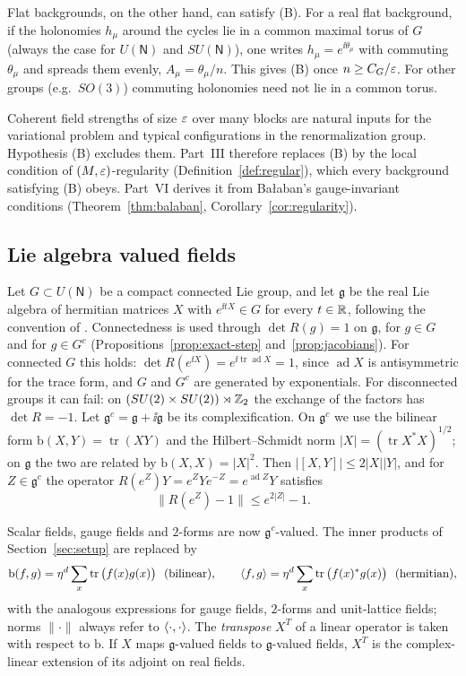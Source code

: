 Flat backgrounds, on the other hand, can satisfy (B). For a real flat background, if the holonomies $h_\mu$ around the cycles lie in a common maximal torus of $G$ (always the case for $U(\mathsf N)$ and $SU(\mathsf N)$), one writes $h_\mu=e^{\ii\theta_\mu}$ with commuting $\theta_\mu$ and spreads them evenly, $A_\mu=\theta_\mu/n$. This gives (B) once $n\ge C_G/\varepsilon$. For other groups (e.g.\ $SO(3)$) commuting holonomies need not lie in a common torus.

Coherent field strengths of size $\varepsilon$ over many blocks are natural inputs for the variational problem and typical configurations in the renormalization group. Hypothesis (B) excludes them. Part~III therefore replaces (B) by the local condition of $(M,\varepsilon)$-regularity (Definition~\ref{def:regular}), which every background satisfying (B) obeys. Part~VI derives it from Ba\l aban's gauge-invariant conditions (Theorem~\ref{thm:balaban}, Corollary~\ref{cor:regularity}).

\subsection{Lie algebra valued fields}\label{ss:12.1}

Let $G\subset U(\mathsf N)$ be a compact connected Lie group, and let $\mathfrak g$ be the real Lie algebra of hermitian matrices $X$ with $e^{\ii tX}\in G$ for every $t\in\mathbb R$, following the convention of \cite{BalPropI,BalBackground}. Connectedness is used through $\det R(g)=1$ on $\mathfrak g$, for $g\in G$ and for $g\in G^c$ (Propositions~\ref{prop:exact-step} and~\ref{prop:jacobians}). For connected $G$ this holds: $\det R(e^{\ii X})=e^{\ii\operatorname{tr}\operatorname{ad}X}=1$, since $\operatorname{ad}X$ is antisymmetric for the trace form, and $G$ and $G^c$ are generated by exponentials. For disconnected groups it can fail: on $(SU(2)\times SU(2))\rtimes\mathbb Z_2$ the exchange of the factors has $\det R=-1$. Let $\mathfrak g^c=\mathfrak g+\ii\mathfrak g$ be its complexification. On $\mathfrak g^c$ we use the bilinear form $\mathrm b(X,Y)=\operatorname{tr}(XY)$ and the Hilbert--Schmidt norm $|X|=(\operatorname{tr}X^*X)^{1/2}$; on $\mathfrak g$ the two are related by $\mathrm b(X,X)=|X|^2$. Then $|[X,Y]|\le2|X||Y|$, and for $Z\in\mathfrak g^c$ the operator $R(e^{Z})Y=e^ZYe^{-Z}=e^{\operatorname{ad}Z}Y$ satisfies
\begin{equation}\label{eq:Ad-bound}
\|R(e^{Z})-1\|\le e^{2|Z|}-1 .
\end{equation}

Scalar fields, gauge fields and $2$-forms are now $\mathfrak g^c$-valued. The inner products of Section~\ref{sec:setup} are replaced by
\[
\mathrm b(f,g)=\eta^d\sum_x\operatorname{tr}\big(f(x)g(x)\big)\ \ \text{(bilinear)},\qquad \ip fg=\eta^d\sum_x\operatorname{tr}\big(f(x)^*g(x)\big)\ \ \text{(hermitian)},
\]
with the analogous expressions for gauge fields, $2$-forms and unit-lattice fields; norms $\|\cdot\|$ always refer to $\langle \cdot,\cdot\rangle$. The \emph{transpose} $X^T$ of a linear operator is taken with respect to $\mathrm b$. If $X$ maps $\mathfrak g$-valued fields to $\mathfrak g$-valued fields, $X^T$ is the complex-linear extension of its adjoint on real fields.

